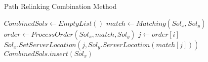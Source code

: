 \begin{algorithm}
  \caption{Path Relinking Combination Method}\label{alg:pr_combination}
  \begin{algorithmic}[0]
    \State $CombinedSols \gets EmptyList()$
    \State $match \gets Matching(Sol_x,Sol_y)$
    \State $order \gets ProcessOrder(Sol_x,match,Sol_y)$
    \State $j \gets order[i]$
    \State $Sol_x.SetServerLocation(j,Sol_y.ServerLocation(match[j]))$
    \State $CombinedSols.insert(Sol_x)$
    \EndIf \EndFor
    \EndProcedure
  \end{algorithmic}
\end{algorithm}
